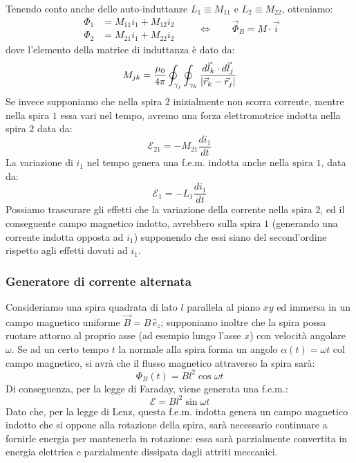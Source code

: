 \documentclass[]{article}
\newcommand{\E}{\mathcal{E}}
\begin{document}
Tenendo conto anche delle auto-induttanze $ L_1 \equiv M_{11} $ e $ L_2 \equiv M_{22} $, otteniamo:
\begin{equation}
	\begin{split}
		\Phi_1 &= M_{11} i_1 + M_{12} i_2 \\ 
		\Phi_2 &= M_{21} i_1 + M_{22} i_2
	\end{split}
	\qquad\Longleftrightarrow\qquad \vec{\Phi}_B = \underbar{M} \cdot \vec{i}
	\label{eq:23}
\end{equation}
dove l'elemento della matrice di induttanza è dato da:
\begin{equation}
	M_{jk} = \frac{\mu_0}{4\pi} \oint_{\gamma_j} \oint_{\gamma_k} \frac{d\vec{l}_k \cdot d\vec{l}_j}{\left\lvert\vec{r}_k - \vec{r}_j\right\rvert}
	\label{eq:24}
\end{equation}
%
Se invece supponiamo che nella spira $ 2 $ inizialmente non scorra corrente, mentre nella spira $ 1 $ essa vari nel tempo, avremo una forza elettromotrice indotta nella spira $ 2 $ data da:
\begin{equation}
	\E_{21} = - M_{21}\frac{di_1}{dt}
	\label{eq:25}
\end{equation}
La variazione di $ i_1 $ nel tempo genera una f.e.m. indotta anche nella spira $ 1 $, data da:
\begin{equation}
	\E_{1} = -L_1 \frac{di_1}{dt}
	\label{eq:26}
\end{equation}
Possiamo trascurare gli effetti che la variazione della corrente nella spira $ 2 $, ed il conseguente campo magnetico indotto, avrebbero sulla spira $ 1 $ (generando una corrente indotta opposta ad $ i_1 $) supponendo che essi siano del second'ordine rispetto agli effetti dovuti ad $ i_1 $.

\subsubsection{Generatore di corrente alternata}

Consideriamo una spira quadrata di lato $ l $ parallela al piano $ xy $ ed immersa in un campo magnetico uniforme $ \vec{B} = B \,\hat{e}_z $; supponiamo inoltre che la spira possa ruotare attorno al proprio asse (ad esempio lungo l'asse $ x $) con velocità angolare $ \omega $. Se ad un certo tempo $ t $ la normale alla spira forma un angolo $ \alpha(t) = \omega t $ col campo magnetico, si avrà che il flusso magnetico attraverso la spira sarà:
\begin{equation}
	\Phi_B (t) = Bl^2 \cos\omega t
	\label{eq:27}
\end{equation}
Di conseguenza, per la legge di Faraday, viene generata una f.e.m.:
\begin{equation}
	\E = Bl^2 \sin\omega t
	\label{eq:28}
\end{equation}
Dato che, per la legge di Lenz, questa f.e.m. indotta genera un campo magnetico indotto che si oppone alla rotazione della spira, sarà necessario continuare a fornirle energia per mantenerla in rotazione: essa sarà parzialmente convertita in energia elettrica e parzialmente dissipata dagli attriti meccanici.
\end{document}
